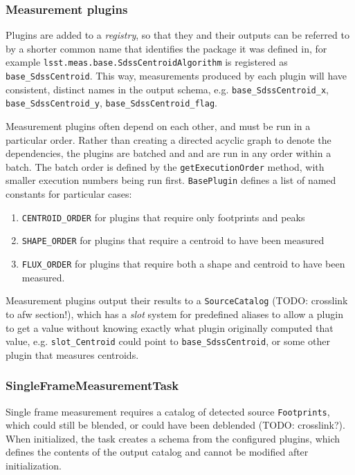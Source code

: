 \subsubsection{Measurement plugins}
\label{sec:plugins}

Plugins are added to a \textit{registry}, so that they and their outputs can be referred to by a shorter common name that identifies the package it was defined in, for example \texttt{lsst.meas.base.SdssCentroidAlgorithm} is registered as \texttt{base\_SdssCentroid}.
This way, measurements produced by each plugin will have consistent, distinct names in the output schema, e.g. \texttt{base\_SdssCentroid\_x}, \texttt{base\_SdssCentroid\_y}, \texttt{base\_SdssCentroid\_flag}.

Measurement plugins often depend on each other, and must be run in a particular order.
Rather than creating a directed acyclic graph to denote the dependencies, the plugins are batched and and are run in any order within a batch.
The batch order is defined by the \texttt{getExecutionOrder} method, with smaller execution numbers being run first.
\texttt{BasePlugin} defines a list of named constants for particular cases:
\begin{enumerate}
    \item \texttt{CENTROID\_ORDER} for plugins that require only footprints and peaks
    \item \texttt{SHAPE\_ORDER} for plugins that require a centroid to have been measured
    \item \texttt{FLUX\_ORDER} for plugins that require both a shape and centroid to have been measured.
\end{enumerate}

Measurement plugins output their results to a \texttt{SourceCatalog} (TODO: crosslink to afw section!), which has a \textit{slot} system for predefined aliases to allow a plugin to get a value without knowing exactly what plugin originally computed that value, e.g. \texttt{slot\_Centroid} could point to \texttt{base\_SdssCentroid}, or some other plugin that measures centroids.

\subsubsection{SingleFrameMeasurementTask}
\label{sec:SingleFrameMeasurementTask}

Single frame measurement requires a catalog of detected source \texttt{Footprints}, which could still be blended, or could have been deblended (TODO: crosslink?).
When initialized, the task creates a schema from the configured plugins, which defines the contents of the output catalog and cannot be modified after initialization.

